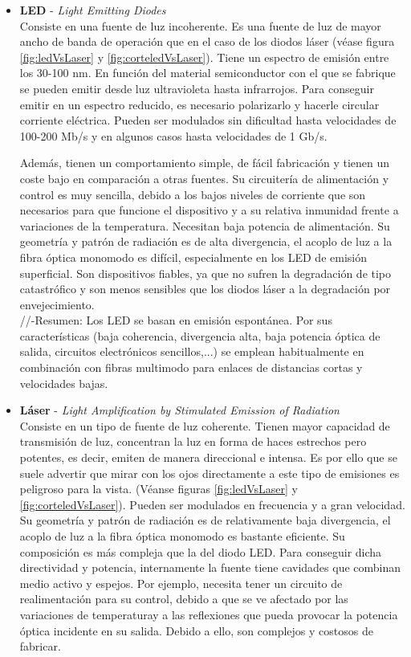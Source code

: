 \begin{itemize}
\begin{itemize}
 		\begin{itemize}
 			\item \textbf{LED} - \textit{Light Emitting Diodes}\\
 			Consiste en una fuente de luz incoherente. Es una fuente de luz de mayor ancho de banda de operación que en el caso de los diodos láser (véase figura \ref{fig:ledVsLaser} y \ref{fig:corteledVsLaser}). Tiene un espectro de emisión entre los 30-100 nm. En función del material semiconductor con el que se fabrique se pueden emitir desde luz ultravioleta hasta infrarrojos. Para conseguir emitir en un espectro reducido, es necesario polarizarlo y hacerle circular corriente eléctrica. Pueden ser modulados sin dificultad hasta velocidades de 100-200 Mb/s y en algunos casos hasta velocidades de 1 Gb/s. 
 			
 			Además, tienen un comportamiento simple, de fácil fabricación y tienen un coste bajo en comparación a otras fuentes. Su circuitería de alimentación y control es muy sencilla, debido a los bajos niveles de corriente que son necesarios para que funcione el dispositivo y a su relativa inmunidad frente a variaciones de la temperatura. Necesitan baja potencia de alimentación. Su geometría y patrón de radiación es de alta divergencia, el acoplo de luz a la fibra óptica monomodo es difícil, especialmente en los LED de emisión superficial. Son dispositivos fiables, ya que no sufren la degradación de tipo catastrófico y son menos sensibles que los diodos láser a la degradación por envejecimiento. \\
 			
 					\textcolor{rositaoscuro}{//-Resumen: Los LED se basan en emisión espontánea. Por sus características (baja coherencia, divergencia alta, baja potencia óptica de salida, circuitos electrónicos sencillos,...) se emplean habitualmente en combinación con fibras multimodo para enlaces de distancias cortas y velocidades bajas.}
 			
 			\item \textbf{Láser} - \textit{Light Amplification by Stimulated Emission of Radiation}\\
 			Consiste en un tipo de fuente de luz coherente. Tienen mayor capacidad de transmisión de luz, concentran la luz en forma de haces estrechos pero potentes, es decir, emiten de manera direccional e intensa. Es por ello que se suele advertir que mirar con los ojos directamente a este tipo de emisiones es peligroso para la vista. (Véanse figuras \ref{fig:ledVsLaser} y \ref{fig:corteledVsLaser}). Pueden ser modulados en frecuencia y a gran velocidad. Su geometría y patrón de radiación es de relativamente baja divergencia, el acoplo de luz a la fibra óptica monomodo es bastante eficiente. Su composición es más compleja que la del diodo LED. Para conseguir dicha directividad y potencia, internamente la fuente tiene cavidades que combinan medio activo y espejos. Por ejemplo, necesita tener un circuito de realimentación para su control, debido a que se ve afectado por las variaciones de temperaturay a las reflexiones que pueda provocar la potencia óptica incidente en su salida. Debido a ello, son complejos y costosos de fabricar. 
 			

\end{itemize}
\end{itemize}
\end{itemize}
